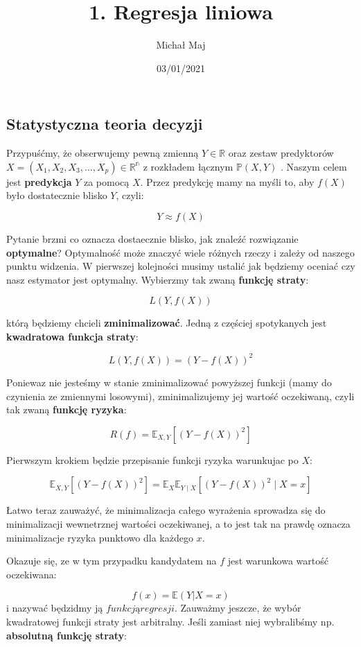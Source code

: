 \documentclass[
]{article}
\title{1. Regresja liniowa}
\author{Michał Maj}
\date{03/01/2021}
\begin{document}
\maketitle

\hypertarget{statystyczna-teoria-decyzji}{%
\subsection{Statystyczna teoria
decyzji}\label{statystyczna-teoria-decyzji}}

Przypuśćmy, że obserwujemy pewną zmienną \(Y \in \mathbb{R}\) oraz
zestaw predyktorów \(X = (X_1, X_2, X_3, …, X_p) \in \mathbb{R^n}\) z
rozkładem łącznym \(\mathbb{P}(X, Y)\) . Naszym celem jest
\textbf{predykcja} \(Y\) za pomocą \(X\). Przez predykcję mamy na myśli
to, aby \(f(X)\) było dostatecznie blisko \(Y\), czyli:

\[
Y ≈ f(X)
\]

Pytanie brzmi co oznacza dostaecznie blisko, jak znaleźć rozwiązanie
\textbf{optymalne}? Optymalność może znaczyć wiele różnych rzeczy i
zależy od naszego punktu widzenia. W pierwszej kolejności musimy ustalić
jak będziemy oceniać czy nasz estymator jest optymalny. Wybierzmy tak
zwaną \textbf{funkcję straty}:

\[
L(Y, f(X))
\]

którą będziemy chcieli \textbf{zminimalizować}. Jedną z częściej
spotykanych jest \textbf{kwadratowa funkcja straty}:

\[
L(Y, f(X)) = (Y -  f(X))^2
\]

Poniewaz nie jesteśmy w stanie zminimalizować powyższej funkcji (mamy do
czynienia ze zmiennymi losowymi), zminimalizujemy jej wartość
oczekiwaną, czyli tak zwaną \textbf{funkcję ryzyka}:

\[
R(f) = \mathbb{E}_{X, Y}[(Y -  f(X))^2]
\]

Pierwszym krokiem będzie przepisanie funkcji ryzyka warunkujac po \(X\):

\[
\mathbb{E}_{X, Y}\left[(Y-f(X))^{2}\right]=\mathbb{E}_{X} \mathbb{E}_{Y \mid X}\left[(Y-f(X))^{2} \mid X=x\right]
\]

Łatwo teraz zauważyć, że minimalizacja całego wyrażenia sprowadza się do
minimalizacji wewnetrznej wartości oczekiwanej, a to jest tak na prawdę
oznacza minimalizacje ryzyka punktowo dla każdego \(x\).

Okazuje się, ze w tym przypadku kandydatem na \(f\) jest warunkowa
wartość oczekiwana:

\[
f(x) = \mathbb{E}(Y| X = x)
\] i nazywać będzidmy ją \(funkcją regresji\). Zauważmy jeszcze, że
wybór kwadratowej funkcji straty jest arbitralny. Jeśli zamiast niej
wybralibśmy np. \textbf{absolutną funkcję straty}:
\end{document}
